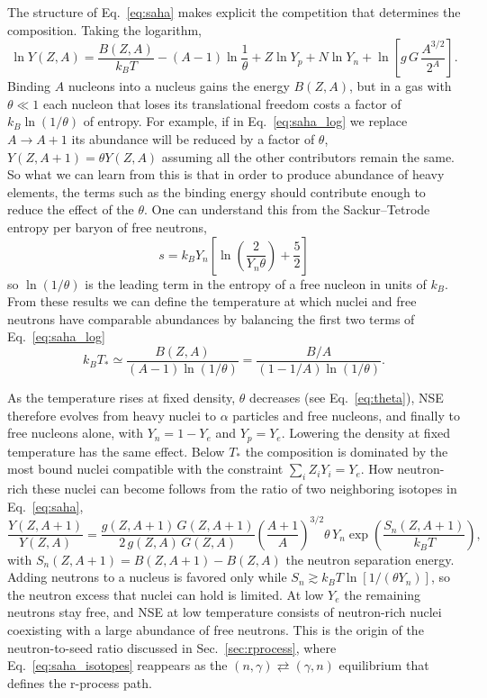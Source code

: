 The structure of Eq.~\ref{eq:saha} makes explicit the competition that determines the composition.
Taking the logarithm,
\begin{equation}\label{eq:saha_log}
  \ln Y(Z,A)=\frac{B(Z,A)}{k_BT}-(A-1)\ln\frac{1}{\theta}+Z\ln Y_p+N\ln Y_n+\ln\left[g\,G\,\frac{A^{3/2}}{2^A}\right].
\end{equation}
Binding $A$ nucleons into a nucleus gains the energy $B(Z,A)$, but in a gas with $\theta\ll1$ each nucleon that loses its translational freedom costs a factor of $k_B\ln(1/\theta)$ of entropy.
For example, if in Eq.~\ref{eq:saha_log} we replace $A\rightarrow A+1$ its abundance will be reduced by a factor of $\theta$, $Y(Z,A+1)=\theta Y(Z,A)$ assuming all the other contributors remain the same. 
So what we can learn from this is that in order to produce abundance of heavy elements, the terms such as the binding energy should contribute enough to reduce the effect of the $\theta$.
One can understand this from the Sackur--Tetrode entropy per baryon of free neutrons,
\begin{equation}
  s=k_BY_n\left[\ln\left(\frac{2}{Y_n\theta}\right)+\frac{5}{2}\right]
\end{equation} 
so $\ln(1/\theta)$ is the leading term in the entropy of a free nucleon in units of $k_B$.
From these results we can define the temperature at which nuclei and free neutrons have comparable abundances by balancing the first two terms of Eq.~\ref{eq:saha_log} 
\begin{equation}\label{eq:T_dissociation}
  k_BT_*\simeq\frac{B(Z,A)}{(A-1)\ln(1/\theta)}=\frac{B/A}{(1-1/A)\ln(1/\theta)} .
\end{equation}
 
As the temperature rises at fixed density, $\theta$ decreases (see Eq.~\ref{eq:theta}), NSE therefore evolves from heavy nuclei to $\alpha$ particles and free nucleons, and finally to free nucleons alone, with $Y_n=1-Y_e$ and $Y_p=Y_e$.
Lowering the density at fixed temperature has the same effect.
Below $T_*$ the composition is dominated by the most bound nuclei compatible with the constraint $\sum_i Z_iY_i=Y_e$.
How neutron-rich these nuclei can become follows from the ratio of two neighboring isotopes in Eq.~\ref{eq:saha},
\begin{equation}\label{eq:saha_isotopes}
  \frac{Y(Z,A+1)}{Y(Z,A)}=\frac{g(Z,A+1)\,G(Z,A+1)}{2\,g(Z,A)\,G(Z,A)}\left(\frac{A+1}{A}\right)^{3/2}\theta\,Y_n\exp\left(\frac{S_n(Z,A+1)}{k_BT}\right),
\end{equation}
with $S_n(Z,A+1)=B(Z,A+1)-B(Z,A)$ the neutron separation energy.
Adding neutrons to a nucleus is favored only while $S_n\gtrsim k_BT\ln[1/(\theta Y_n)]$, so the neutron excess that nuclei can hold is limited.
At low $Y_e$ the remaining neutrons stay free, and NSE at low temperature consists of neutron-rich nuclei coexisting with a large abundance of free neutrons.
This is the origin of the neutron-to-seed ratio discussed in Sec.~\ref{sec:rprocess}, where Eq.~\ref{eq:saha_isotopes} reappears as the $(n,\gamma)\rightleftarrows(\gamma,n)$ equilibrium that defines the r-process path.

